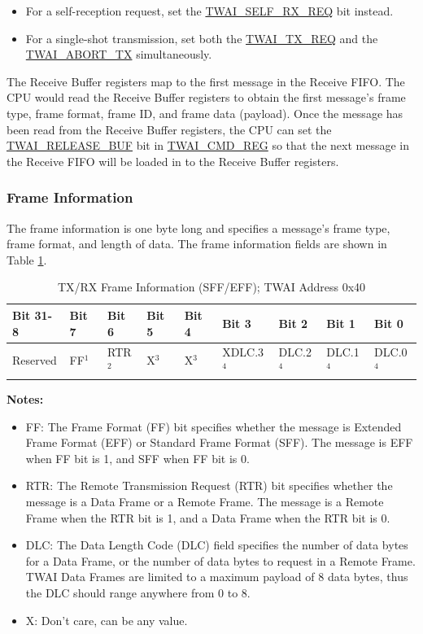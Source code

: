 \documentclass[main\_\_EN.tex]{subfiles}
\begin{document}
\begin{itemize}
    \item For a self-reception request, set the \hyperref[fielddesc:TWAISELFRXREQ]{TWAI\_SELF\_RX\_REQ} bit instead.
    \item For a single-shot transmission, set both the \hyperref[fielddesc:TWAITXREQ]{TWAI\_TX\_REQ} and the \hyperref[fielddesc:TWAIABORTTX]{TWAI\_ABORT\_TX} simultaneously.
\end{itemize}

The Receive Buffer registers map to the first message in the Receive FIFO. The CPU would read the Receive Buffer registers to obtain the first message’s frame type, frame format, frame ID, and frame data (payload). Once the message has been read from the Receive Buffer registers, the CPU can set the \hyperref[fielddesc:TWAIRELEASEBUF]{TWAI\_RELEASE\_BUF} bit in \hyperref[regdesc:TWAICMDREG]{TWAI\_CMD\_REG} so that the next message in the Receive FIFO will be loaded in to the Receive Buffer
registers.


\subsubsection{Frame Information}
The frame information is one byte long and specifies a message’s frame type, frame format, and length of data. The frame information fields are shown in Table \ref{table:frame_info}.

\begin{longtable}[c]{|p{1.4cm}|p{1.4cm}|p{1.4cm}|p{1.4cm}|p{1.4cm}|p{1.4cm}|p{1.4cm}|p{1.4cm}|p{1.4cm}|}
    \caption{TX/RX Frame Information (SFF/EFF); TWAI Address 0x40}
    \label{table:frame_info}\\
    \hline
       \rowcolor{lightgray}
    Bit 31-8 & Bit 7 & Bit 6 & Bit 5 & Bit 4 & Bit 3 & Bit 2 & Bit 1 & Bit 0\\
    \hline
    Reserved & FF$^1$ & RTR$^2$  & X$^3$  & X$^3$  & XDLC.3$^4$ & DLC.2$^4$ & DLC.1$^4$ & DLC.0$^4$\\
    \hline
\end{longtable}
\vspace{-1.5em}
{\bfseries Notes:}\\
\begin{itemize}
    \item FF: The Frame Format (FF) bit specifies whether the message is Extended Frame Format (EFF) or Standard Frame Format (SFF). The message is EFF when FF bit is 1, and SFF when FF bit is 0.
    \item RTR: The Remote Transmission Request (RTR) bit specifies whether the message is a Data Frame or a Remote Frame. The message is a Remote Frame when the RTR bit is 1, and a Data Frame when the RTR bit is 0.
    \item DLC: The Data Length Code (DLC) field specifies the number of data bytes for a Data Frame, or the number of data bytes to request in a Remote Frame. TWAI Data Frames are limited to a maximum payload of 8 data bytes, thus the DLC should range anywhere from 0 to 8.
    \item X: Don’t care, can be any value.
\end{itemize}
\end{document}
